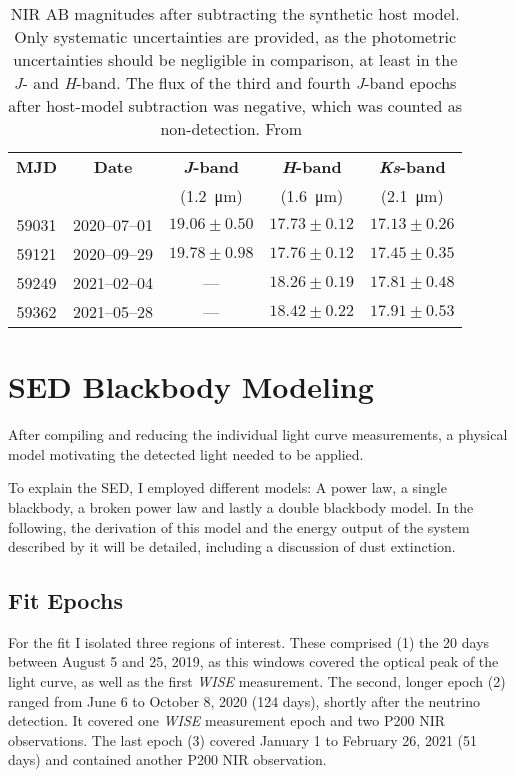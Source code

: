 \begin{table}
    \centering
    \begin{tabular}{c c c c  c}
        \hline
        \textbf{MJD} & \textbf{Date} & \textbf{\textit{J}-band} & \textbf{\textit{H}-band} & \textbf{\textit{Ks}-band} \\
                     &               & (\SI{1.2}{\micro\m})     & (\SI{1.6}{\micro\m})     & (\SI{2.1}{\micro\m})      \\
        \hline
        \hline
        59031        & 2020--07--01  & $19.06 \pm 0.50$         & $ 17.73 \pm 0.12$        & $17.13 \pm 0.26$          \\
        59121        & 2020--09--29  & $19.78 \pm 0.98$         & $ 17.76 \pm 0.12$        & $17.45 \pm 0.35$          \\
        59249        & 2021--02--04  & ---                      & $ 18.26 \pm 0.19$        & $17.81 \pm 0.48$          \\
        59362        & 2021--05--28  & ---                      & $ 18.42 \pm 0.22$        & $17.91 \pm 0.53$          \\
        \hline
    \end{tabular}
    \caption[NIR magnitudes]{NIR AB magnitudes after subtracting the synthetic host model. Only systematic uncertainties are provided, as the photometric uncertainties should be negligible in comparison, at least in the \textit{J}- and \textit{H}-band. The flux of the third and fourth \textit{J}-band epochs after host-model subtraction was negative, which was counted as non-detection. From~\cite{Reusch2022}}\label{tab:p200_nir}
\end{table}

\section{SED Blackbody Modeling}
After compiling and reducing the individual light curve measurements, a physical model motivating the detected light needed to be applied.

To explain the SED, I employed different models: A power law, a single blackbody, a broken power law and lastly a double blackbody model. In the following, the derivation of this model and the energy output of the system described by it will be detailed, including a discussion of dust extinction.

\subsection{Fit Epochs}
For the fit I isolated three regions of interest. These comprised (1) the 20 days between August 5 and 25, 2019, as this windows covered the optical peak of the light curve, as well as the first \textit{WISE} measurement. The second, longer epoch (2) ranged from June 6 to October 8, 2020 (124 days), shortly after the neutrino detection. It covered one \textit{WISE} measurement epoch and two P200 NIR observations. The last epoch (3) covered January 1 to February 26, 2021 (51 days) and contained another P200 NIR observation.

